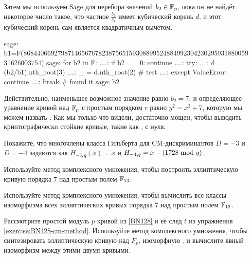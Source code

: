 \begin{example}
Затем мы используем Sage для перебора значений $b_2\in \mathbb{F}_p$, пока он не найдёт некоторое число такое, что частное $\frac{b_2}{b_1}$ имеет кубический корень $d$, и этот кубический корень сам является квадратичным вычетом. 
\begin{sagecommandline}
sage: b1=F(86844066927987146567678238756515930889952488499230423029593188005931626003754)
sage: for b2 in F:
....:     if b2 == 0: continue
....:     try:
....:         d = (b2/b1).nth_root(3)
....:         _ = d.nth_root(2) # test
....:     except ValueError: continue
....:     break # found it
sage: b2
\end{sagecommandline}
Действительно, наименьшее возможное значение равно $b_2=7$, и определяющее уравнение  кривой над $\mathbb{F}_p$ с простым порядком $r$ равно 
$
y^2 = x^3 + 7
$,
которую мы можем назвать . Как мы только что видели,  достаточно мощен, чтобы выводить криптографически стойкие кривые, такие как , с нуля.
\end{example}
\begin{exercise}
\label{ex:Low_order_Hilbert_polys} Покажите, что многочлены класса Гильберта для CM-дискриминантов $D=-3$ и $D=-4$ задаются как $H_{-3,q}(x)=x$ и $H_{-4,q}= x-(1728 \text{ mod } q)$.
\end{exercise}
\begin{exercise}
Используйте метод комплексного умножения, чтобы построить эллиптическую кривую порядка $7$ над простым полем $\mathbb{F}_{13}$.
\end{exercise}
\begin{exercise}
Используйте метод комплексного умножения, чтобы вычислить все классы изоморфизма всех эллиптических кривых порядка $7$ над простым полем $\mathbb{F}_{13}$.
\end{exercise}
\begin{exercise}
\label{exercise:BN128-cm-method}
Рассмотрите простой модуль $p$ кривой  из \examplename{} \ref{BN128} и её след $t$ из упражнения \ref{exercise:BN128-cm-method}. Используйте метод комплексного умножения, чтобы синтезировать эллиптическую кривую над $F_p$, изоморфную , и вычислите явный изоморфизм между этими двумя кривыми.
\end{exercise}

